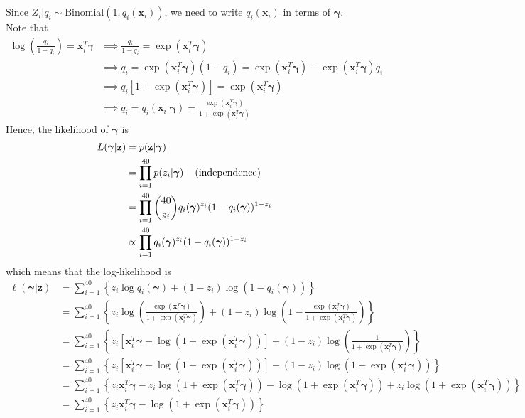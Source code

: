 \documentclass[11pt]{article}
\newcommand*\htab{\hspace{4 mm}}
\newcommand*\ba{\[ \begin{aligned}}
\newcommand*\ea{\end{aligned} \]}
\newcommand*\bx{\mathbf{x}}
\newcommand*\bz{\mathbf{z}}
\newcommand*\bgamma{\boldsymbol{\gamma}}
\renewcommand\;{\,}
\begin{document}
\section{}
Since $Z_i | q_i \sim \text{Binomial}(1, q_i(\bx_i))$, we need to write $q_i(\bx_i)$ in terms of $\bgamma$. Note that
\ba
\log\left(\frac{q_i}{1 - q_i}\right) = \bx_i^T \gamma 
	& \implies \frac{q_i}{1 - q_i} = \exp\left( \bx_i^T \bgamma \right) \\
	& \implies q_i = \exp\left( \bx_i^T \bgamma \right) (1 - q_i)
		= \exp\left( \bx_i^T \bgamma \right) - \exp\left( \bx_i^T \bgamma \right) q_i \\
	& \implies q_i \left[1 + \exp\left( \bx_i^T \bgamma \right)\right] = \exp\left( \bx_i^T \bgamma \right) \\
	& \implies q_i = q_i(\bx_i | \bgamma) 
		= \frac{ \exp\left( \bx_i^T \bgamma \right) }{1 + \exp\left( \bx_i^T \bgamma \right)}
\ea
Hence, the likelihood of $\bgamma$ is 
\ba
L(\bgamma | \bz) & = p(\bz | \bgamma) \\
	& = \prod_{i=1}^{40} p(z_i | \bgamma) \htab \text{(independence)} \\
	& = \prod_{i=1}^{40} {40 \choose z_i} q_i(\bgamma)^{z_i} (1 - q_i(\bgamma))^{1 - z_i} \\
	& \propto \prod_{i=1}^{40} q_i(\bgamma)^{z_i} (1 - q_i(\bgamma))^{1 - z_i}
\ea
which means that the log-likelihood is
\ba
\ell(\bgamma | \bz)
	& = \sum_{i=1}^{40} \left\{ z_i \log q_i(\bgamma) + (1 - z_i) \log(1 - q_i(\bgamma)) \right\} \\
	& = \sum_{i=1}^{40} \left\{ 
		z_i \log \left( \frac{ \exp\left( \bx_i^T \bgamma \right) }{1 + \exp\left( \bx_i^T \bgamma \right)} \right)
		+ (1 - z_i) \log\left( 1 - 
		\frac{ \exp\left( \bx_i^T \bgamma \right) }{1 + \exp\left( \bx_i^T \bgamma \right)}
		\right)
		\right\} \\
	& = \sum_{i=1}^{40} \left\{ z_i
		\left[ \bx_i^T \bgamma - \log\left(1 + \exp(\bx_i^T \bgamma) \right) \right]
		+ (1 - z_i) \log \left( \frac{1}{1 + \exp(\bx_i^T \bgamma)} \right)
		\right\} \\
	& = \sum_{i=1}^{40} \left\{ z_i
		\left[ \bx_i^T \bgamma - \log\left(1 + \exp(\bx_i^T \bgamma) \right) \right]
		- (1 - z_i) \log \left( 1 + \exp(\bx_i^T \bgamma) \right)
		\right\} \\
	& = \sum_{i=1}^{40} \left\{ 
		z_i \bx_i^T \bgamma - z_i \log\left(1 + \exp(\bx_i^T \bgamma) \right) 
		-  \log \left( 1 + \exp(\bx_i^T \bgamma) \right)
		+ z_i \log \left( 1 + \exp(\bx_i^T \bgamma) \right) 
		\right\} \\
	& = \boxed{ \sum_{i=1}^{40} \left\{ z_i \bx_i^T \bgamma - \log\left(1 + \exp(\bx_i^T \bgamma)\right) \right\} }
\ea
\end{document}
